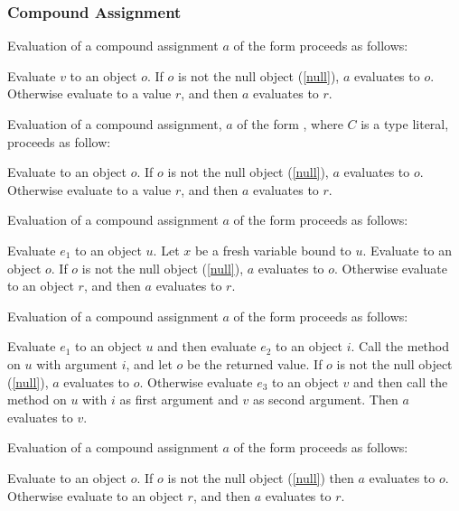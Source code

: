 \documentclass{article}
\begin{document}
\subsubsection{Compound Assignment}

\LMHash{}
Evaluation of a compound assignment $a$ of the form 
proceeds as follows:

\LMHash{}
Evaluate $v$ to an object $o$.
If $o$ is not the null object (\ref{null}), $a$ evaluates to $o$.
Otherwise evaluate  to a value $r$,
and then $a$ evaluates to $r$.

\LMHash{}
Evaluation of a compound assignment, $a$ of the form , where $C$ is a type literal, proceeds as follow:

\LMHash{}
Evaluate  to an object $o$.
If $o$ is not the null object (\ref{null}), $a$ evaluates to $o$.
Otherwise evaluate  to a value $r$,
and then $a$ evaluates to $r$.


\LMHash{}
Evaluation of a compound assignment $a$ of the form 
proceeds as follows:

\LMHash{}
Evaluate $e_1$ to an object $u$.
Let $x$ be a fresh variable bound to $u$.
Evaluate  to an object $o$.
If $o$ is not the null object (\ref{null}), $a$ evaluates to $o$.
Otherwise evaluate  to an object $r$,
and then $a$ evaluates to $r$.

\LMHash{}
Evaluation of a compound assignment $a$ of the form 
proceeds as follows:

\LMHash{}
Evaluate $e_1$ to an object $u$ and then evaluate $e_2$ to an object $i$.
Call the \code{[]} method on $u$ with argument $i$, and let $o$ be the returned value.
If $o$ is not the null object (\ref{null}), $a$ evaluates to $o$.
Otherwise evaluate $e_3$ to an object $v$
and then call the \code{[]=} method on $u$ with $i$ as first argument and $v$ as second argument.
Then $a$ evaluates to $v$.

\LMHash{}
Evaluation of a compound assignment $a$ of the form 
proceeds as follows:

\LMHash{}
Evaluate  to an object $o$.
If $o$ is not the null object (\ref{null}) then $a$ evaluates to $o$.
Otherwise evaluate  to an object $r$,
and then $a$ evaluates to $r$.
\end{document}
